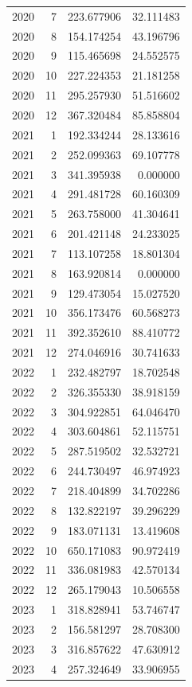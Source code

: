 \begin{tabular}{rrrr}
2020 & 7 & 223.677906 & 32.111483 \\
2020 & 8 & 154.174254 & 43.196796 \\
2020 & 9 & 115.465698 & 24.552575 \\
2020 & 10 & 227.224353 & 21.181258 \\
2020 & 11 & 295.257930 & 51.516602 \\
2020 & 12 & 367.320484 & 85.858804 \\
2021 & 1 & 192.334244 & 28.133616 \\
2021 & 2 & 252.099363 & 69.107778 \\
2021 & 3 & 341.395938 & 0.000000 \\
2021 & 4 & 291.481728 & 60.160309 \\
2021 & 5 & 263.758000 & 41.304641 \\
2021 & 6 & 201.421148 & 24.233025 \\
2021 & 7 & 113.107258 & 18.801304 \\
2021 & 8 & 163.920814 & 0.000000 \\
2021 & 9 & 129.473054 & 15.027520 \\
2021 & 10 & 356.173476 & 60.568273 \\
2021 & 11 & 392.352610 & 88.410772 \\
2021 & 12 & 274.046916 & 30.741633 \\
2022 & 1 & 232.482797 & 18.702548 \\
2022 & 2 & 326.355330 & 38.918159 \\
2022 & 3 & 304.922851 & 64.046470 \\
2022 & 4 & 303.604861 & 52.115751 \\
2022 & 5 & 287.519502 & 32.532721 \\
2022 & 6 & 244.730497 & 46.974923 \\
2022 & 7 & 218.404899 & 34.702286 \\
2022 & 8 & 132.822197 & 39.296229 \\
2022 & 9 & 183.071131 & 13.419608 \\
2022 & 10 & 650.171083 & 90.972419 \\
2022 & 11 & 336.081983 & 42.570134 \\
2022 & 12 & 265.179043 & 10.506558 \\
2023 & 1 & 318.828941 & 53.746747 \\
2023 & 2 & 156.581297 & 28.708300 \\
2023 & 3 & 316.857622 & 47.630912 \\
2023 & 4 & 257.324649 & 33.906955 \\

\end{tabular}
